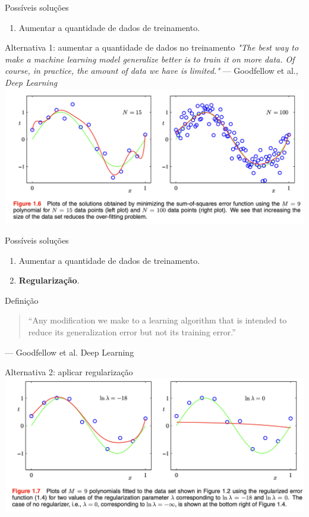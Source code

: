 \documentclass{beamer}
\begin{document}
\begin{frame}{Possíveis soluções}
    \begin{enumerate}
        \item Aumentar a quantidade de dados de treinamento.
    \end{enumerate}
\end{frame}

\begin{frame}{Alternativa 1: aumentar a quantidade de dados no treinamento}
\tiny{\textit{"The best way to make a machine learning model generalize better is to train it on
more data. Of course, in practice, the amount of data we have is limited."} --- Goodfellow et al., \textit{Deep Learning}}
\centering
\includegraphics[width=\textwidth,height=0.8\textheight,keepaspectratio]{imgs/bishop_example/3.png}
\end{frame}

\begin{frame}{Possíveis soluções}
    \begin{enumerate}
        \item Aumentar a quantidade de dados de treinamento.
        \item \textbf{Regularização}.
    \end{enumerate}
\end{frame}

\begin{frame}{Definição}
\begin{quote}
``Any modification we make to a learning algorithm that is intended to reduce its generalization error but not its training error.''
\end{quote}
\vspace{0.5cm}
\raggedleft
--- Goodfellow et al. Deep Learning
\end{frame}


\begin{frame}{Alternativa 2: aplicar regularização}
\centering
\includegraphics[width=\textwidth,height=0.8\textheight,keepaspectratio]{imgs/bishop_example/4.png}
\end{frame}
\end{document}
